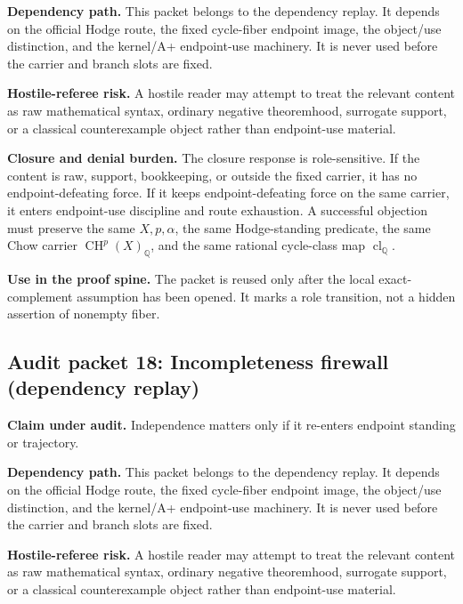 \documentclass[11pt]{article}
\newcommand{\QQ}{\mathbb{Q}}
\newcommand{\CH}{\operatorname{CH}}
\newcommand{\clQ}{\operatorname{cl}_{\QQ}}
\begin{document}
\par\noindent\textbf{Dependency path.} This packet belongs to the dependency replay. It depends on the official Hodge route, the fixed cycle-fiber endpoint image, the object/use distinction, and the kernel/A+ endpoint-use machinery. It is never used before the carrier and branch slots are fixed.


\par\noindent\textbf{Hostile-referee risk.} A hostile reader may attempt to treat the relevant content as raw mathematical syntax, ordinary negative theoremhood, surrogate support, or a classical counterexample object rather than endpoint-use material.


\par\noindent\textbf{Closure and denial burden.} The closure response is role-sensitive. If the content is raw, support, bookkeeping, or outside the fixed carrier, it has no endpoint-defeating force. If it keeps endpoint-defeating force on the same carrier, it enters endpoint-use discipline and route exhaustion. A successful objection must preserve the same $X,p,\alpha$, the same Hodge-standing predicate, the same Chow carrier $\CH^p(X)_\QQ$, and the same rational cycle-class map $\clQ$.


\par\noindent\textbf{Use in the proof spine.} The packet is reused only after the local exact-complement assumption has been opened. It marks a role transition, not a hidden assertion of nonempty fiber.


\subsection{Audit packet 18: Incompleteness firewall (dependency replay)}


\par\noindent\textbf{Claim under audit.} Independence matters only if it re-enters endpoint standing or trajectory.


\par\noindent\textbf{Dependency path.} This packet belongs to the dependency replay. It depends on the official Hodge route, the fixed cycle-fiber endpoint image, the object/use distinction, and the kernel/A+ endpoint-use machinery. It is never used before the carrier and branch slots are fixed.


\par\noindent\textbf{Hostile-referee risk.} A hostile reader may attempt to treat the relevant content as raw mathematical syntax, ordinary negative theoremhood, surrogate support, or a classical counterexample object rather than endpoint-use material.
\end{document}
